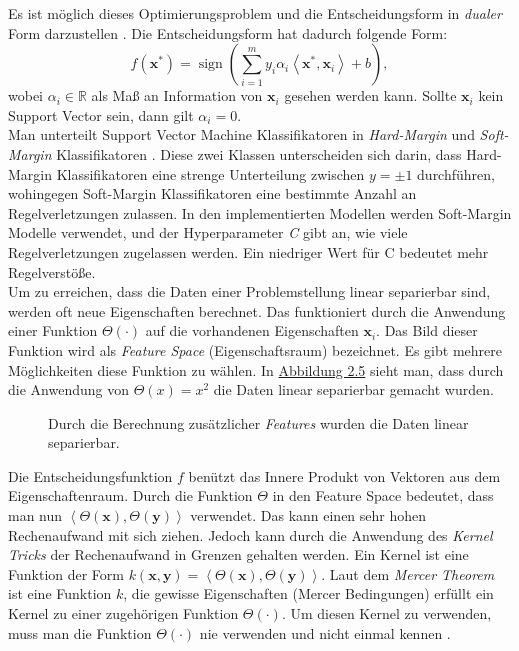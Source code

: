 Es ist m\"oglich dieses Optimierungsproblem und die Entscheidungsform in \textit{dualer} Form darzustellen \cite{handson}. Die Entscheidungsform hat dadurch folgende Form:
$$ f(\mathbf{x^*}) = \operatorname{sign}(\sum_{i=1}^m y_i\alpha_i \left\langle \mathbf{x^*}, \mathbf{x}_i \right\rangle + b), $$
wobei $\alpha_i \in \mathbb{R}$ als Ma{\ss} an Information von $\mathbf{x}_i$ gesehen werden kann. Sollte $\mathbf{x}_i$ kein Support Vector sein, dann gilt $\alpha_i = 0$.\\

Man unterteilt Support Vector Machine Klassifikatoren in \textit{Hard-Margin} und \textit{Soft-Margin} Klassifikatoren \cite{shalev}. Diese zwei Klassen 
unterscheiden sich darin, dass Hard-Margin Klassifikatoren eine strenge Unterteilung zwischen $y = \pm1$ durchf\"uhren, wohingegen Soft-Margin 
Klassifikatoren eine bestimmte Anzahl an Regelverletzungen zulassen. In den implementierten Modellen werden Soft-Margin Modelle verwendet, und der 
Hyperparameter \textit{C} gibt an, wie viele Regelverletzungen zugelassen werden. Ein niedriger Wert f\"ur C bedeutet mehr Regelverst\"o{\ss}e.  \\

Um zu erreichen, dass die Daten einer Problemstellung linear separierbar sind, werden oft neue Eigenschaften berechnet. Das funktioniert durch die 
Anwendung einer Funktion $\Theta(\cdot)$ auf die vorhandenen Eigenschaften $\mathbf{x}_i$. Das Bild dieser Funktion wird als \textit{Feature Space} (Eigenschaftsraum) bezeichnet.
Es gibt mehrere M\"oglichkeiten diese Funktion zu w\"ahlen. In 
\hyperref[fig:svm2]{Abbildung 2.5} sieht man, dass durch die Anwendung von $\Theta(x) = x^2$ die Daten linear separierbar gemacht wurden. \\

\begin{figure}[ht]
  \label{fig:svm2}
  \begin{center}
    \begin{tiny}
    \end{tiny}
  \end{center}
  \caption[Berechnung zus\"atzlicher Features aus vorhandenen Inputs]
    {Durch die Berechnung zus\"atzlicher \textit{Features} wurden die Daten linear separierbar.}
\end{figure}

Die Entscheidungsfunktion $f$ ben\"utzt das Innere Produkt von Vektoren aus dem Eigenschaftenraum. Durch die Funktion $\Theta$ in den
Feature Space bedeutet, dass man nun $\left\langle \Theta(\mathbf{x}), \Theta(\mathbf{y}) \right\rangle$ verwendet. Das kann einen sehr hohen Rechenaufwand 
mit sich ziehen. Jedoch kann durch die Anwendung des \textit{Kernel Tricks} der Rechenaufwand in Grenzen gehalten werden. Ein Kernel ist eine Funktion 
der Form $k(\mathbf{x}, \mathbf{y}) = \left\langle \Theta(\mathbf{x}), \Theta(\mathbf{y}) \right\rangle$. Laut dem \textit{Mercer Theorem} ist eine Funktion 
$k$, die gewisse Eigenschaften (Mercer Bedingungen) erf\"ullt ein Kernel zu einer zugeh\"origen Funktion $\Theta(\cdot)$. Um 
diesen Kernel zu verwenden, muss man die Funktion $\Theta(\cdot)$ nie verwenden und nicht einmal kennen \cite{handson}. \\

